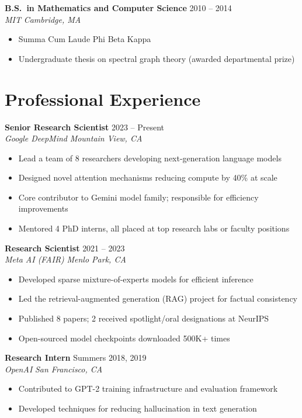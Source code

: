 \documentclass[11pt,a4paper]{article}
\newcommand{\cventry}[4]{%
  \textbf{#1} \hfill {\color{lightgray}#2}\\
  {\color{accent}\textit{#3}} \hfill {\color{lightgray}\textit{#4}}\\[2pt]
}
\newcommand{\cvsep}{\vspace{6pt}}
\begin{document}
\cvsep

\cventry{B.S.\ in Mathematics and Computer Science}{2010 -- 2014}{MIT}{Cambridge, MA}
\begin{itemize}[leftmargin=1.5em, nosep, itemsep=2pt]
  \item Summa Cum Laude \quad Phi Beta Kappa
  \item Undergraduate thesis on spectral graph theory (awarded departmental prize)
\end{itemize}

\section{Professional Experience}

\cventry{Senior Research Scientist}{2023 -- Present}{Google DeepMind}{Mountain View, CA}
\begin{itemize}[leftmargin=1.5em, nosep, itemsep=2pt]
  \item Lead a team of 8 researchers developing next-generation language models
  \item Designed novel attention mechanisms reducing compute by 40\% at scale
  \item Core contributor to Gemini model family; responsible for efficiency improvements
  \item Mentored 4 PhD interns, all placed at top research labs or faculty positions
\end{itemize}

\cvsep

\cventry{Research Scientist}{2021 -- 2023}{Meta AI (FAIR)}{Menlo Park, CA}
\begin{itemize}[leftmargin=1.5em, nosep, itemsep=2pt]
  \item Developed sparse mixture-of-experts models for efficient inference
  \item Led the retrieval-augmented generation (RAG) project for factual consistency
  \item Published 8 papers; 2 received spotlight/oral designations at NeurIPS
  \item Open-sourced model checkpoints downloaded 500K+ times
\end{itemize}

\cvsep

\cventry{Research Intern}{Summers 2018, 2019}{OpenAI}{San Francisco, CA}
\begin{itemize}[leftmargin=1.5em, nosep, itemsep=2pt]
  \item Contributed to GPT-2 training infrastructure and evaluation framework
  \item Developed techniques for reducing hallucination in text generation
\end{itemize}
\end{document}
